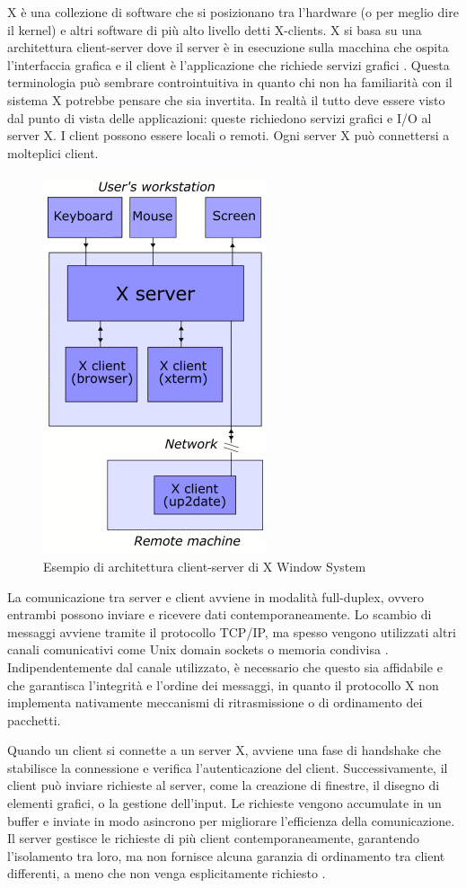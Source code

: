 \documentclass[12pt,a4paper,openright,twoside]{book}
\begin{document}
X è una collezione di software che si posizionano tra l'hardware (o per meglio dire il kernel) e altri software di più alto livello detti X-clients. X si basa su una architettura client-server dove il server è in esecuzione sulla macchina che ospita l'interfaccia grafica e il client è l'applicazione che richiede servizi grafici \cite{Scheifler1986}. Questa terminologia può sembrare controintuitiva in quanto chi non ha familiarità con il sistema X potrebbe pensare che sia invertita. In realtà il tutto deve essere visto dal punto di vista delle applicazioni: queste richiedono servizi grafici e I/O al server X.
I client possono essere locali o remoti. Ogni server X può connettersi a molteplici client.
\begin{figure}
    \centering
    \includegraphics[width=.3\linewidth]{figures/X_client_server_example.png}
    \caption[xarch]{Esempio di architettura client-server di X Window System \footnotemark}
\end{figure}

La comunicazione tra server e client avviene in modalità full-duplex, ovvero entrambi possono inviare e ricevere dati contemporaneamente. Lo scambio di messaggi avviene tramite il protocollo TCP/IP, ma spesso vengono utilizzati altri canali comunicativi come Unix domain sockets o memoria condivisa \cite{xDevGuide}. Indipendentemente dal canale utilizzato, è necessario che questo sia affidabile e che garantisca l'integrità e l'ordine dei messaggi, in quanto il protocollo X non implementa nativamente meccanismi di ritrasmissione o di ordinamento dei pacchetti.

Quando un client si connette a un server X, avviene una fase di handshake che stabilisce la connessione e verifica l'autenticazione del client. Successivamente, il client può inviare richieste al server, come la creazione di finestre, il disegno di elementi grafici, o la gestione dell'input. Le richieste vengono accumulate in un buffer e inviate in modo asincrono per migliorare l'efficienza della comunicazione. Il server gestisce le richieste di più client contemporaneamente, garantendo l'isolamento tra loro, ma non fornisce alcuna garanzia di ordinamento tra client differenti, a meno che non venga esplicitamente richiesto \cite{xDevGuide}.
\end{document}
